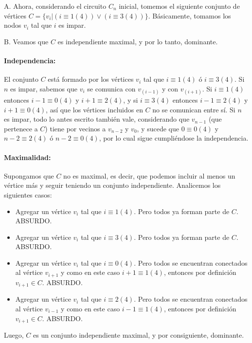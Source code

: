 A. Ahora, considerando el circuito $C_n$ inicial, tomemos el siguiente conjunto de vértices $C = \{v_i |(i \equiv 1 (4)) \vee (i \equiv 3 (4))\}$.  Básicamente, tomamos los nodos $v_i$ tal que $i$ es impar.

B. Veamos que $C$ es independiente maximal, y por lo tanto, dominante.

\paragraph*{Independencia:} El conjunto $C$ está formado por los vértices $v_i$ tal que $i \equiv 1 (4)$ ó $i \equiv 3 (4)$. Si $n$ es impar, sabemos que $v_i$ se comunica con $v_{(i-1)}$ y con $v_{(i+1)}$. Si $i \equiv 1 (4)$ entonces $i-1 \equiv 0 (4)$ y $i+1 \equiv 2 (4)$, y si $i \equiv 3 (4)$ entonces $i-1 \equiv 2 (4)$ y $i+1 \equiv 0 (4)$, así que los vértices incluidos en $C$ no se comunican entre sí. Si $n$ es impar, todo lo antes escrito también vale, considerando que $v_{n-1}$ (que pertenece a $C$) tiene por vecinos a $v_{n-2}$ y $v_{0}$, y sucede que $0 \equiv 0 (4)$ y $n-2 \equiv 2 (4)$ ó $n-2 \equiv 0 (4)$, por lo cual sigue cumpliéndose la independencia.

\paragraph*{Maximalidad:} Supongamos que $C$ no es maximal, es decir, que podemos incluir al menos un vértice más y seguir teniendo un conjunto independiente. Analicemos los siguientes casos:

\begin{itemize}
	\item Agregar un vértice $v_i$ tal que $i \equiv 1 (4)$.  Pero todos ya forman parte de $C$. ABSURDO.
	\item Agregar un vértice $v_i$ tal que $i \equiv 3 (4)$.  Pero todos ya forman parte de $C$. ABSURDO.
	\item Agregar un vértice $v_i$ tal que $i \equiv 0 (4)$.  Pero todos se encuentran conectados al vértice $v_{i+1}$ y como en este caso $i+1 \equiv 1(4)$, entonces por definición $v_{i+1} \in C$. ABSURDO.
	\item Agregar un vértice $v_i$ tal que $i \equiv 2 (4)$.  Pero todos se encuentran conectados al vértice $v_{i-1}$ y como en este caso $i-1 \equiv 1(4)$, entonces por definición $v_{i+1} \in C$. ABSURDO.
\end{itemize}

Luego, $C$ es un conjunto independiente maximal, y por consiguiente, dominante. 

